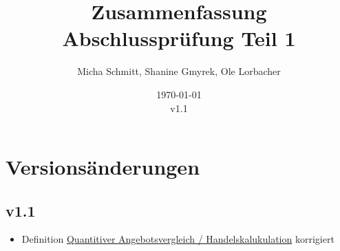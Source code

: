 \documentclass[10pt]{article}
\title{Zusammenfassung Abschlussprüfung Teil 1}
\author{Micha Schmitt, Shanine Gmyrek, Ole Lorbacher}
\date{\today \\ v1.1}
\begin{document}
\maketitle
\vspace{2cm}
\tableofcontents
\let\tableofcontents\relax

\pagebreak
\setcounter{page}{1}
\setcounter{section}{-1}
\section{Versionsänderungen}
\subsection{v1.1}
\begin{itemize}
    \item Definition \hyperref[sec:Handelskalkulation]{Quantitiver Angebotsvergleich / Handelskalukulation} korrigiert
\end{itemize}




\pagebreak



\pagebreak



\pagebreak



\pagebreak



\pagebreak



\pagebreak


\end{document}
